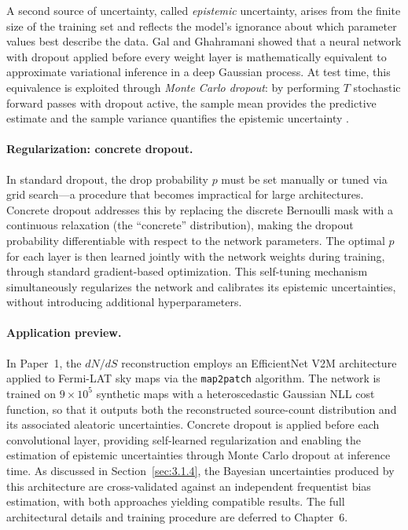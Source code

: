 A second source of uncertainty, called \textit{epistemic} uncertainty, arises from the finite size of the training set and reflects the model's ignorance about which parameter values best describe the data. Gal and Ghahramani \cite{Gal:2016} showed that a neural network with dropout applied before every weight layer is mathematically equivalent to approximate variational inference in a deep Gaussian process. At test time, this equivalence is exploited through \textit{Monte Carlo dropout}: by performing $T$ stochastic forward passes with dropout active, the sample mean provides the predictive estimate and the sample variance quantifies the epistemic uncertainty \cite{Gal:2016}.

\paragraph{Regularization: concrete dropout.}

In standard dropout, the drop probability $p$ must be set manually or tuned via grid search---a procedure that becomes impractical for large architectures. Concrete dropout \cite{Gal:2017} addresses this by replacing the discrete Bernoulli mask with a continuous relaxation (the ``concrete'' distribution), making the dropout probability differentiable with respect to the network parameters. The optimal $p$ for each layer is then learned jointly with the network weights during training, through standard gradient-based optimization. This self-tuning mechanism simultaneously regularizes the network and calibrates its epistemic uncertainties, without introducing additional hyperparameters.

\paragraph{Application preview.}

In Paper~1, the $dN/dS$ reconstruction employs an EfficientNet V2M architecture \cite{Tan:2021} applied to Fermi-LAT sky maps via the \texttt{map2patch} algorithm. The network is trained on $9 \times 10^5$ synthetic maps with a heteroscedastic Gaussian NLL cost function, so that it outputs both the reconstructed source-count distribution and its associated aleatoric uncertainties. Concrete dropout is applied before each convolutional layer, providing self-learned regularization and enabling the estimation of epistemic uncertainties through Monte Carlo dropout at inference time. As discussed in Section~\ref{sec:3.1.4}, the Bayesian uncertainties produced by this architecture are cross-validated against an independent frequentist bias estimation, with both approaches yielding compatible results. The full architectural details and training procedure are deferred to Chapter~6.


